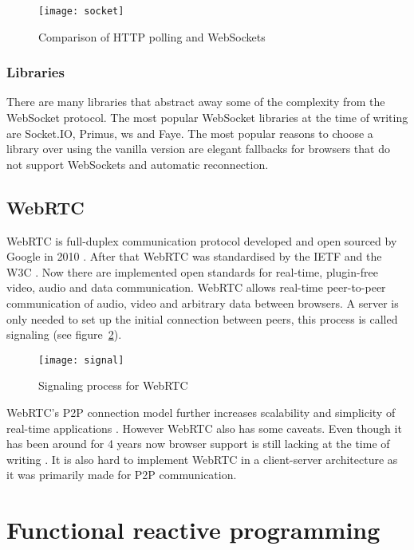\begin{figure}[H]
	\centering
	\texttt{[image: socket]}
	\caption{Comparison of HTTP polling and WebSockets \cite{poll-socket}}
	\label{figure:socket}
\end{figure}

\subsection{Libraries} %
\label{sub:websockets-implementations}

There are many libraries that abstract away some of the complexity from the WebSocket protocol. The most popular WebSocket libraries at the time of writing are Socket.IO, Primus, ws and Faye. The most popular reasons to choose a library over using the vanilla version are elegant fallbacks for browsers that do not support WebSockets and automatic reconnection.

\section{WebRTC} %
\label{sub:webrtc}

WebRTC is full-duplex communication protocol developed and open sourced by Google in 2010 \cite{webrtc-intro}. After that WebRTC was standardised by the IETF and the W3C \cite{webrtc-intro}. Now there are implemented open standards for real-time, plugin-free video, audio and data communication. WebRTC allows real-time peer-to-peer communication of audio, video and arbitrary data between browsers. A server is only needed to set up the initial connection between peers, this process is called signaling \cite{webrtc} (see figure~\ref{figure:signal}).

\begin{figure}[H]
	\centering
	\texttt{[image: signal]}
	\caption{Signaling process for WebRTC \cite{webrtc-intro}}
	\label{figure:signal}
\end{figure}

WebRTC's P2P connection model further increases scalability and simplicity of real-time applications \cite{webrtc}. However WebRTC also has some caveats. Even though it has been around for 4 years now browser support is still lacking at the time of writing \cite{webrtc-browser}. It is also hard to implement WebRTC in a client-server architecture \cite{hn} as it was primarily made for P2P communication.

\chapter{Functional reactive programming} %
\label{sub:frp}

